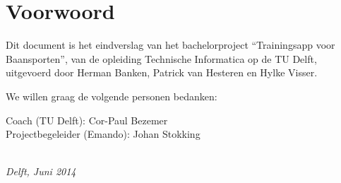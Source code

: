 \chapter*{Voorwoord}

Dit document is het eindverslag van het bachelorproject ``Trainingsapp voor Baansporten'', van de opleiding Technische Informatica op de TU Delft, uitgevoerd door Herman Banken, Patrick van Hesteren en Hylke Visser.

\bigskip

\noindent We willen graag de volgende personen bedanken:

\medskip

\noindent
Coach (TU Delft): Cor-Paul Bezemer\\
Projectbegeleider (Emando): Johan Stokking

\bigskip

\begin{flushright}
{\makeatletter\itshape
    \@author \\
    Delft, Juni 2014
\makeatother}
\end{flushright}